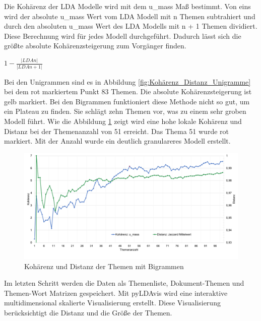 Die Kohärenz der LDA Modelle wird mit dem u\_mass Maß bestimmt. Von eins wird der absolute u\_mass Wert vom LDA Modell mit n Themen subtrahiert und durch den absoluten u\_mass Wert des LDA Modells mit n + 1 Themen dividiert. Diese Berechnung wird für jedes Modell durchgeführt. Dadurch lässt sich die größte absolute Kohärenzsteigerung zum Vorgänger finden.

\begin{center}
	$1-\frac{\left|LDA n\right|}{\left|LDA n + 1\right|}$ 
\end{center}


Bei den Unigrammen sind es in Abbildung \ref{fig:Kohärenz_Distanz_Unigramme} bei dem rot markiertem Punkt 83 Themen. Die absolute Kohärenzsteigerung ist gelb markiert. Bei den Bigrammen funktioniert diese Methode nicht so gut, um ein Plateau zu finden. Sie schlägt zehn Themen vor, was zu einem sehr groben Modell führt. Wie die Abbildung \ref{fig:Kohärenz_Distanz_Bigramme} zeigt wird eine hohe lokale Kohärenz und Distanz bei der Themenanzahl von 51 erreicht. Das Thema 51 wurde rot markiert. Mit der Anzahl wurde ein deutlich granulareres Modell erstellt. 

\begin{landscape}
\begin{figure}
	\centering
	\includegraphics[width=\textwidth,keepaspectratio=true]{img/coherenceAndDistanceBigram.png}
	\caption{
		Kohärenz und Distanz der Themen mit Bigrammen
	}
	\label{fig:Kohärenz_Distanz_Bigramme}
\end{figure}
\end{landscape}

Im letzten Schritt werden die Daten als Themenliste, Dokument-Themen und Themen-Wort Matrizen gespeichert. Mit \gls{pyLDAvis} wird eine interaktive multidimensional skalierte Visualisierung erstellt. Diese Visualisierung berücksichtigt die Distanz und die Größe der Themen.


